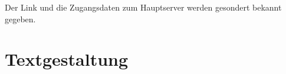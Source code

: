 \documentclass[ngerman,paper=a4,fontsize=8pt,headings=small,draft=no,parskip=half,noonelinecaption]{scrreprt}
\begin{document}
Der Link und die Zugangsdaten zum Hauptserver werden gesondert bekannt gegeben.



\chapter{Textgestaltung}

\minitoc

% 
% 
% 
% 
% 
% 
% 
\end{document}
